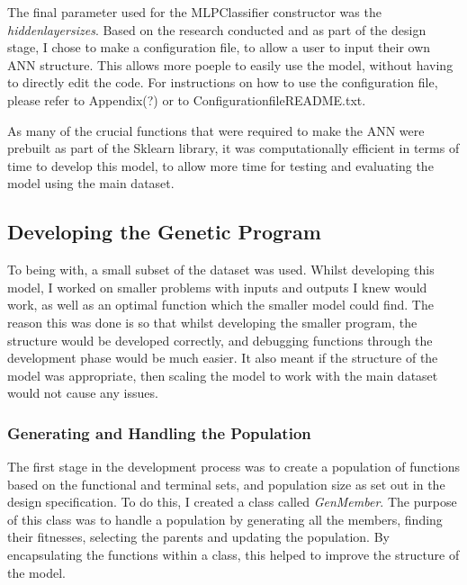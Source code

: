 \documentclass[11pt]{article}
\begin{document}
The final parameter used for the MLPClassifier constructor was the \textit{hidden\textunderscore layer\textunderscore sizes}. Based on the research conducted and as part of the design stage, I chose to make a configuration file, to allow a user to input their own ANN structure. This allows more poeple to easily use the model, without having to directly edit the code. For instructions on how to use the configuration file, please refer to Appendix(?) or to Configuration\textunderscore file\textunderscore README.txt.

As many of the crucial functions that were required to make the ANN were prebuilt as part of the Sklearn library, it was computationally efficient in terms of time to develop this model, to allow more time for testing and evaluating the model using the main dataset. 
\subsection{Developing the Genetic Program}
To being with, a small subset of the dataset was used. Whilst developing this model, I worked on smaller problems with inputs and outputs I knew would work, as well as an optimal function which the smaller model could find. The reason this was done is so that whilst developing the smaller program, the structure would be developed correctly, and debugging functions through the development phase would be much easier. It also meant if the structure of the model was appropriate, then scaling the model to work with the main dataset would not cause any issues. 
 \subsubsection{Generating and Handling the Population}
The first stage in the development process was to create a population of functions based on the functional and terminal sets, and population size as set out in the design specification. To do this, I created a class called \textit{GenMember}. The purpose of this class was to handle a population by generating all the members, finding their fitnesses, selecting the parents and updating the population. By encapsulating the functions within a class, this helped to improve the structure of the model. 
\end{document}
